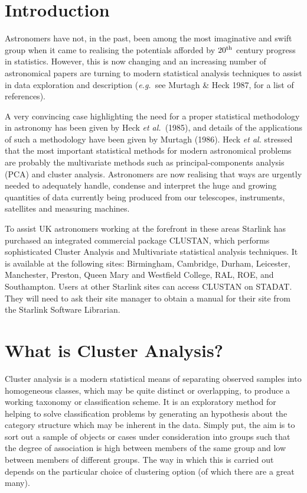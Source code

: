 
\section{Introduction}
Astronomers have not, in the past, been among the most imaginative and
swift group when it came to realising the potentials afforded by
$20^{\rm th}$ century progress in statistics. However, this is now
changing and an increasing number of astronomical papers are
turning to modern statistical analysis techniques to assist in data exploration
and description ({\it e.g.}\ see Murtagh \& Heck 1987, for a list of
references).

A very convincing case highlighting the need for a proper statistical
methodology in astronomy has been given by Heck {\it et al.}\ (1985),
and details of the applications of such a methodology have been given by
Murtagh (1986). Heck {\it et al.} stressed that the most important
statistical methods for modern astronomical problems are probably the
multivariate methods such as principal-components analysis (PCA) and
cluster analysis. Astronomers are now realising that ways are urgently
needed to adequately handle, condense and interpret the huge and growing
quantities of data currently being produced from our telescopes,
instruments, satellites and measuring machines.

To assist UK astronomers working at the forefront in these areas
Starlink has purchased an integrated commercial package {\small
CLUSTAN}, which performs sophisticated Cluster Analysis and Multivariate
statistical analysis techniques. It is available at the following sites:
Birmingham, Cambridge, Durham, Leicester, Manchester, Preston, Queen
Mary and Westfield College, RAL, ROE, and Southampton.  Users at other
Starlink sites can access {\small CLUSTAN} on STADAT.  They will need to
ask their site manager to obtain a manual for their site from the
Starlink Software Librarian.

\section{What is Cluster Analysis?}
Cluster analysis is a modern statistical means of separating
observed samples into homogeneous classes, which may be quite distinct
or overlapping, to produce a working taxonomy or classification scheme.
It is an exploratory method for helping to solve classification problems by
generating an hypothesis about the category structure which may be
inherent in the data. Simply put, the aim is to sort out a sample of
objects or cases under consideration into groups such that the degree of
association is high between members of the same group and low between
members of different groups. The way in which this is carried out
depends on the particular choice of clustering option (of which there
are a great many).

